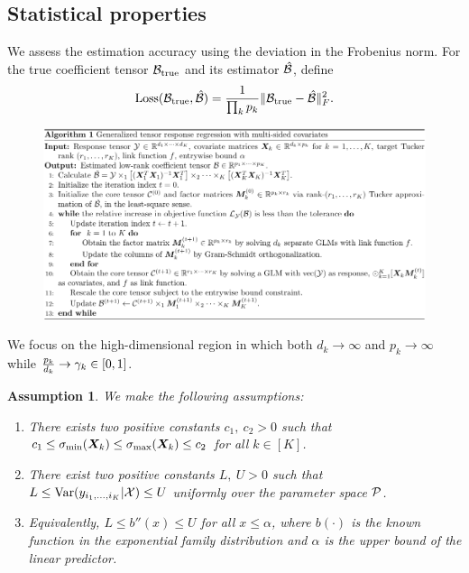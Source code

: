 \documentclass[twoside]{article}
\theoremstyle{plain}
\newtheorem{assumption}{Assumption}
\theoremstyle{definition}
\begin{document}
\subsection{Statistical properties}
We assess the estimation accuracy using the deviation in the Frobenius norm. For the true coefficient tensor $\mathcal{B}_{\text{true}}$ and its estimator $\hat {\mathcal{B}}$, define
\[
\text{Loss}(\mathcal{B}_{\text{true}}, \hat {\mathcal{B}})={ 1 \over \prod_k p_k} \lVert\mathcal{B}_{\text{true}}- \hat {\mathcal{B}}\rVert_F^2.
\]

\begin{figure}
\begin{center}
\includegraphics[width=17.5cm]{algorithm.pdf}
  \end{center}
  \end{figure}
  
We focus on the high-dimensional region in which both $d_k\to \infty$ and $p_k\to\infty$ while ${p_k\over d_k} \to \gamma_k \in[0,1]$. 
\begin{assumption}\label{ass}We make the following assumptions:
\vspace{-.5cm}
\begin{enumerate}
\item [1.] There exists two positive constants $c_1,\ c_2>0$ such that $c_1\leq \sigma_{\min}(\bm X_k)\leq  \sigma_{\max}(\bm X_k)\leq c_2$ for all $k\in[K]$.
\item [2.] There exist two positive constants $L,\ U>0$ such that $L\leq \text{Var}(y_{i_1,\ldots,i_K}|\mathcal{X})\leq U$ uniformly over the parameter space $\mathcal{P}$. 
\item [2'.] Equivalently, $L\leq b''(x) \leq U$ for all $x\leq \alpha$, where $b(\cdot)$ is the known function in the exponential family distribution and $\alpha$ is the upper bound of the linear predictor. 
\end{enumerate}
\end{assumption}
\end{document}
